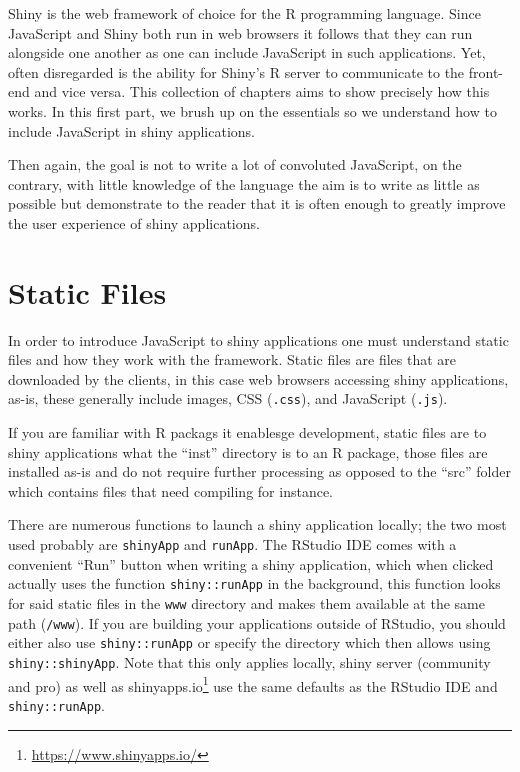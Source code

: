 \documentclass[
]{krantz}
\renewcommand{\href}[2]{#2\footnote{\url{#1}}}
\begin{document}
Shiny is the web framework of choice for the R programming language. Since JavaScript and Shiny both run in web browsers it follows that they can run alongside one another as one can include JavaScript in such applications. Yet, often disregarded is the ability for Shiny's R server to communicate to the front-end and vice versa. This collection of chapters aims to show precisely how this works. In this first part, we brush up on the essentials so we understand how to include JavaScript in shiny applications.

Then again, the goal is not to write a lot of convoluted JavaScript, on the contrary, with little knowledge of the language the aim is to write as little as possible but demonstrate to the reader that it is often enough to greatly improve the user experience of shiny applications.

\hypertarget{static-files}{%
\section*{Static Files}\label{static-files}}


In order to introduce JavaScript to shiny applications one must understand static files and how they work with the framework. Static files are files that are downloaded by the clients, in this case web browsers accessing shiny applications, as-is, these generally include images, CSS (\texttt{.css}), and JavaScript (\texttt{.js}).

If you are familiar with R packags it enablesge development, static files are to shiny applications what the ``inst'' directory is to an R package, those files are installed as-is and do not require further processing as opposed to the ``src'' folder which contains files that need compiling for instance.

There are numerous functions to launch a shiny application locally; the two most used probably are \texttt{shinyApp} and \texttt{runApp}. The RStudio IDE comes with a convenient ``Run'' button when writing a shiny application, which when clicked actually uses the function \texttt{shiny::runApp} in the background, this function looks for said static files in the \texttt{www} directory and makes them available at the same path (\texttt{/www}). If you are building your applications outside of RStudio, you should either also use \texttt{shiny::runApp} or specify the directory which then allows using \texttt{shiny::shinyApp}. Note that this only applies locally, shiny server (community and pro) as well as \href{https://www.shinyapps.io/}{shinyapps.io} use the same defaults as the RStudio IDE and \texttt{shiny::runApp}.
\end{document}
